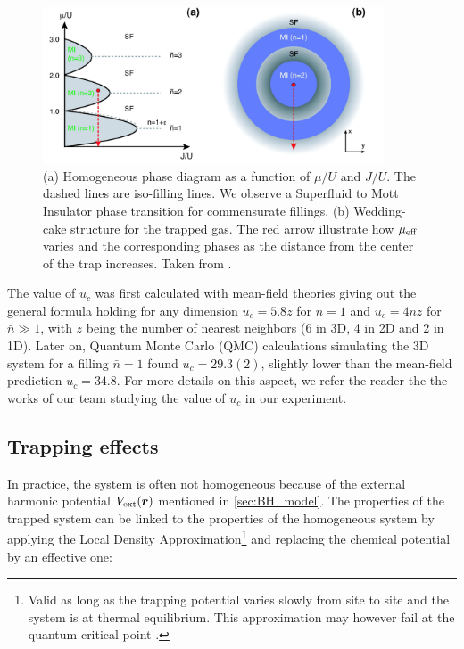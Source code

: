 \begin{figure}
    \centering
    \includegraphics[width=0.9\textwidth]{Fig/Chapter2/mott_lobes.png}
    \caption[Homogeneous phase diagram as a function of $\mu/U$ and $J/U$ and wedding-cake structure for the trapped gas]{(a) Homogeneous phase diagram as a function of $\mu/U$ and $J/U$. The dashed lines are iso-filling lines. We observe a Superfluid to Mott Insulator phase transition for commensurate fillings. (b) Wedding-cake structure for the trapped gas. The red arrow illustrate how $\mu_{\rm{eff}}$ varies and the corresponding phases as the distance from the center of the trap increases. Taken from \cite{bloch2008many}.}
    \label{fig:mott_lobes}
\end{figure}

The value of $u_c$ was first calculated with mean-field theories giving out the general formula holding for any dimension $u_c=5.8z$ for $\bar{n}=1$ and $u_c=4 \bar{n} z$ for $\bar{n} \gg 1$, with $z$ being the number of nearest neighbors (6 in 3D, 4 in 2D and 2 in 1D). Later on, Quantum Monte Carlo (QMC)  calculations \cite{capogrosso2007phase} simulating the 3D system for a filling $\bar{n}=1$ found $u_c=29.3(2)$, \ie slightly lower than the mean-field prediction $u_c=34.8$. For more details on this aspect, we refer the reader the the works of our team \cite{carcy_these,herce2021studying} studying the value of $u_c$ in our experiment. 



\subsection{Trapping effects}

\label{sec:ch2_trapping_effects}

In practice, the system is often not homogeneous because of the external harmonic potential $V_{\rm{ext}}(\bm{r})$ mentioned in \ref{sec:BH_model}. The properties of the trapped system can be linked to the properties of the homogeneous system by applying the Local Density Approximation\footnote{Valid as long as the trapping potential varies slowly from site to site and the system is at thermal equilibrium. This approximation may however fail at the quantum critical point \cite{pollet2012recent}.} \cite{bergkvist2004local} and replacing the chemical potential by an effective one:

